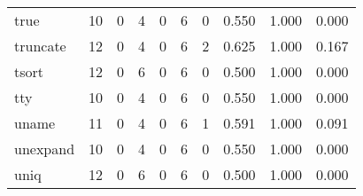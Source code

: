 \begin{longtable}{lp{1.3cm}p{1.3cm}p{1.3cm}p{1.3cm}p{1.3cm}p{1.3cm}p{1.3cm}p{1.3cm}p{1.3cm}}
true      &                     10 &                                             0 &                                            4 &                                           0 &                                            6 &                                          0 &                                0.550 &                                  1.000 &                                0.000 \\
truncate  &                     12 &                                             0 &                                            4 &                                           0 &                                            6 &                                          2 &                                0.625 &                                  1.000 &                                0.167 \\
tsort     &                     12 &                                             0 &                                            6 &                                           0 &                                            6 &                                          0 &                                0.500 &                                  1.000 &                                0.000 \\
tty       &                     10 &                                             0 &                                            4 &                                           0 &                                            6 &                                          0 &                                0.550 &                                  1.000 &                                0.000 \\
uname     &                     11 &                                             0 &                                            4 &                                           0 &                                            6 &                                          1 &                                0.591 &                                  1.000 &                                0.091 \\
unexpand  &                     10 &                                             0 &                                            4 &                                           0 &                                            6 &                                          0 &                                0.550 &                                  1.000 &                                0.000 \\
uniq      &                     12 &                                             0 &                                            6 &                                           0 &                                            6 &                                          0 &                                0.500 &                                  1.000 &                                0.000 \\

\end{longtable}
